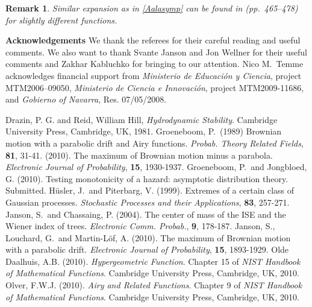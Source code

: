 \documentclass[11pt]{article}
\newtheorem{remark}{Remark}[section]
\begin{document}
\begin{remark}
{\rm Similar expansion as in \eqref{Aalasymp} can be found in {{\small \sc {}}} (pp.~465--478) for slightly different functions.
}
\end{remark}

\vspace{0.3cm}
\noindent
{\bf Acknowledgements}
We thank the referees  for their careful reading and useful comments. We also want to thank Svante Janson and Jon Wellner for their useful comments and Zakhar Kabluchko for bringing  {{\small \sc {}}} to our attention. Nico M.~Temme acknowledges financial support from {\emph{Ministerio de Educaci\'on y Ciencia}}, project MTM2006--09050, {\emph{Ministerio de Ciencia e Innovaci\'on}}, project MTM2009-11686, and {\it Gobierno of Navarra}, Res. 07/05/2008.

\begin{thebibliography}{}
{\small \sc Drazin, P. G. and Reid, William Hill,}
{\em Hydrodynamic Stability}.
Cambridge University Press, Cambridge, UK, 1981.
{\small \sc Groeneboom, P.\ (1989)}
Brownian motion with a parabolic drift and Airy functions.
{\em Probab. Theory Related Fields},
{\bf 81}, 31-41.
 (2010).
The maximum of Brownian motion minus a parabola.
{\em Electronic Journal of Probability}, {\bf 15}, 1930-1937.
 {\small \sc Groeneboom, P.\ and Jongbloed, G.}
(2010). Testing monotonicity of a hazard: asymptotic distribution theory.
Submitted.
{\small \sc H\"usler, J.\ and Piterbarg, V.} (1999).
Extremes of a certain class of Gaussian processes.
{\em Stochastic Processes and their Applications},
{\bf 83}, 257-271.
{\small \sc Janson, S.\ and Chassaing, P.} (2004).
The center of mass of the ISE and the Wiener index of trees.
{\em Electronic Comm. Probab.}, {\bf 9}, 178-187. 
{\small \sc Janson, S., Louchard, G.\ and Martin-L\"of, A.} (2010).
The maximum of Brownian motion with a parabolic drift.
{\em Electronic Journal of Probability}, {\bf 15}, 1893-1929.
{\small \sc Olde Daalhuis, A.B.}  (2010).
{\em Hypergeometric Function}. Chapter 15 of
{\em NIST Handbook of Mathematical Functions}.
Cambridge University Press, Cambridge, UK, 2010.
{\small \sc Olver, F.W.J.}  (2010).
{\em Airy and Related Functions}. Chapter 9 of
{\em NIST Handbook of Mathematical Functions}.
Cambridge University Press, Cambridge, UK, 2010.
\end{thebibliography}
\end{document}
